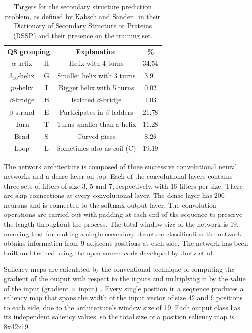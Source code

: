 \documentclass{article}
\begin{document}
\begin{table}
	\begin{tabular}{cc|c|c}
		\multicolumn{2}{c}{\textbf{Q8 grouping}} &  \textbf{Explanation} & \textbf{\%}\\ 
		$\alpha$-helix & H & Helix with 4 turns & 34.54 \\ 
		$3_{10}$-helix & G & Smaller helix with 3 turns & 3.91 \\ 
		$pi$-helix      & I & Bigger helix with 5 turns & 0.02 \\ \hline
		$\beta$-bridge & B & Isolated $\beta$-bridge & 1.03 \\ 
		$\beta$-strand & E & Participates in $\beta$-ladders & 21.78\\ \hline
		Turn & T & Turns smaller than a helix & 11.28 \\ 
		Bend & S & Curved piece & 8.26 \\ 
		Loop & L & Sometimes also as coil (C) & 19.19
	\end{tabular}
	\caption{Targets for the secondary structure prediction problem, as defined by Kabsch and Sander~\cite{Kabsch1983} in their Dictionary of Secondary Structure or Proteins (DSSP) and their presence on the training set.}
	\label{table:q8}
\end{table}

The network architecture is composed of three successive convolutional neural networks and a dense layer on top. Each of the convolutional layers contains three sets of filters of size 3, 5 and 7, respectively, with 16 filters per size. There are skip connections at every convolutional layer. The dense layer has 200 neurons and is connected to the softmax output layer. The convolution operations are carried out with padding at each end of the sequence to preserve the length throughout the process. The total window size of the network is 19, meaning that for making a single secondary structure classification the network obtains information from 9 adjacent positions at each side. The network has been built and trained using the open-source code developed by Jurtz et al.~\cite{Jurtz2017}.

Saliency maps are calculated by the conventional technique of computing the gradient of the output with respect to the inputs and multiplying it by the value of the input (gradient $\times$ input)~\cite{Shrikumar2016}. Every single position in a sequence produces a saliency map that spans the width of the input vector of size 42 and 9 positions to each side, due to the architecture's window size of 19. Each output class has its independent saliency values, so the total size of a position saliency map is 8x42x19.
\end{document}
